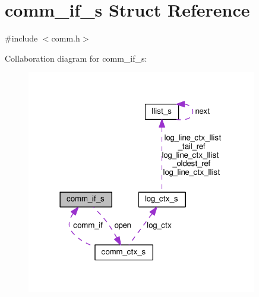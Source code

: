 \hypertarget{structcomm__if__s}{}\section{comm\+\_\+if\+\_\+s Struct Reference}
\label{structcomm__if__s}


{\ttfamily \#include $<$comm.\+h$>$}



Collaboration diagram for comm\+\_\+if\+\_\+s\+:\nopagebreak
\begin{figure}[H]
\begin{center}
\leavevmode
\includegraphics[width=285pt]{structcomm__if__s__coll__graph}
\end{center}
\end{figure}
